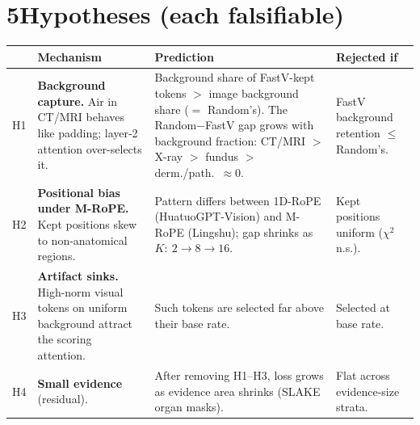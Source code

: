 \documentclass[11pt]{article}
\begin{document}
\section*{5\quad Hypotheses (each falsifiable)}
\begin{center}\small
\begin{tabularx}{\linewidth}{@{}l>{\raggedright}X>{\raggedright}X>{\raggedright\arraybackslash}X@{}}
\toprule
   & Mechanism & Prediction & Rejected if \\
\midrule
H1 & \textbf{Background capture.} Air in CT/MRI behaves like padding; layer-2 attention
     over-selects it.
   & Background share of FastV-kept tokens $>$ image background share ($=$ Random's). The
     Random$-$FastV gap grows with background fraction: CT/MRI $>$ X-ray $>$ fundus $>$
     derm./path.\ $\approx 0$.
   & FastV background retention $\le$ Random's. \\
\addlinespace
H2 & \textbf{Positional bias under M-RoPE.} Kept positions skew to non-anatomical regions.
   & Pattern differs between 1D-RoPE (HuatuoGPT-Vision) and M-RoPE (Lingshu); gap shrinks
     as $K{:}\ 2\!\to\!8\!\to\!16$.
   & Kept positions uniform ($\chi^2$ n.s.). \\
\addlinespace
H3 & \textbf{Artifact sinks.} High-norm visual tokens on uniform background attract the
     scoring attention.
   & Such tokens are selected far above their base rate.
   & Selected at base rate. \\
\addlinespace
H4 & \textbf{Small evidence} (residual).
   & After removing H1--H3, loss grows as evidence area shrinks (SLAKE organ masks).
   & Flat across evidence-size strata. \\
\bottomrule
\end{tabularx}
\end{center}

\end{document}
